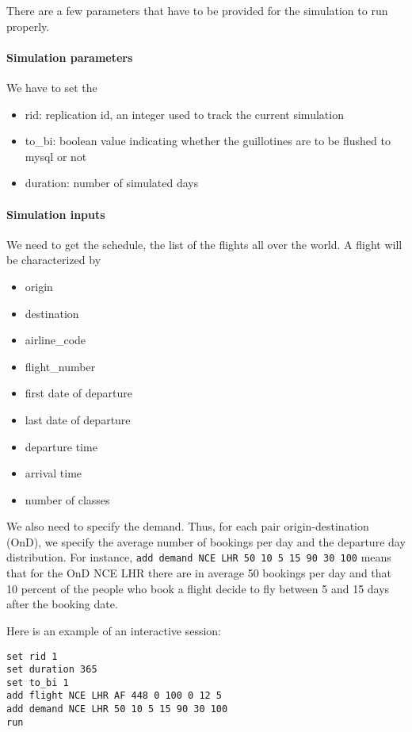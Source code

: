 \documentclass[11pt]{JHEP3}
\begin{document}
There are a few parameters that have to be provided for the simulation to run properly. 

\paragraph{Simulation parameters} We have to set the 

\begin{itemize}
\item rid: replication id, an integer used to track the current simulation
\item to\_bi: boolean value indicating whether the guillotines are to be flushed to mysql or not
\item duration: number of simulated days
\end{itemize}

\paragraph{Simulation inputs} We need to get the schedule, the list of the flights all over the world. A flight will be characterized by 

\begin{itemize}
\item origin
\item destination
\item airline\_code
\item flight\_number
\item first date of departure
\item last date of departure
\item departure time
\item arrival time
\item number of classes
\end{itemize}

We also need to specify the demand. Thus, for each pair origin-destination (OnD), we specify the average number of bookings per day and the departure day distribution. For instance, \texttt{add demand NCE LHR 50 10 5 15 90 30 100} means that for the OnD NCE LHR there are in average 50 bookings per day and that 10 percent of the people who book a flight decide to fly between 5 and 15 days after the booking date.

Here is an example of an interactive session:

\begin{verbatim}
set rid 1
set duration 365
set to_bi 1
add flight NCE LHR AF 448 0 100 0 12 5
add demand NCE LHR 50 10 5 15 90 30 100
run
\end{verbatim}
\end{document}
